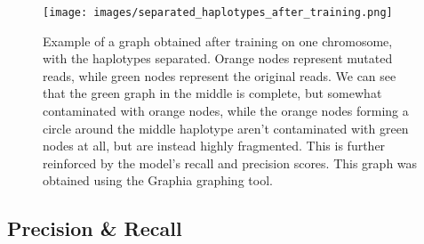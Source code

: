 \documentclass[times, utf8, diplomski, english]{fer_eng}
\begin{document}
\begin{figure}
	\centering
	\texttt{[image: images/separated\_haplotypes\_after\_training.png]}
	\caption[Separated graph after training]{Example of a graph obtained after training on one chromosome, with the haplotypes separated. Orange nodes represent mutated reads, while green nodes represent the original reads. We can see that the green graph in the middle is complete, but somewhat contaminated with orange nodes, while the orange nodes forming a circle around the middle haplotype aren't contaminated with green nodes at all, but are instead highly fragmented. This is further reinforced by the model's recall and precision scores. This graph was obtained using the Graphia\footnotemark{} graphing tool.}
	\label{fig:separated graph after training}
\end{figure}

\subsection{Precision \& Recall}
\label{subsec:precision and recall}
\end{document}
